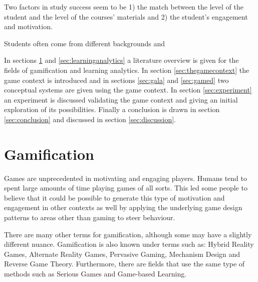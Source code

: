 \documentclass[11pt]{article}
\begin{document}
Two factors in study success seem to be 1) the match between the level of the student and the level of the courses' materials and 2) the student's engagement and motivation.

Students often come from different backgrounds and 

\cite{Horizon2012}









In sections \ref{sec:gamification} and \ref{sec:learninganalytics} a literature overview is given for the fields of gamification and learning analytics. In section \ref{sec:thegamecontext} the game context is introduced and in sections \ref{sec:gala} and \ref{sec:gamed} two conceptual systems are given using the game context. In section \ref{sec:experiment} an experiment is discussed validating the game context and giving an initial exploration of its possibilities. Finally a conclusion is drawn in section \ref{sec:conclusion} and discussed in section \ref{sec:discussion}.

\section{Gamification}\label{sec:gamification}
Games are unprecedented in motivating and engaging players. Humans tend to spent large amounts of time playing games of all sorts. This led some people to believe that it could be possible to generate this type of motivation and engagement in other contexts as well by applying the underlying game design patterns to areas other than gaming to steer behaviour.

There are many other terms for gamification, although some may have a slightly different nuance. Gamification is also known under terms such as: Hybrid Reality Games, Alternate Reality Games, Pervasive Gaming, Mechanism Design and Reverse Game Theory. Furthermore, there are fields that use the same type of methods such as Serious Games and Game-based Learning.
\end{document}
